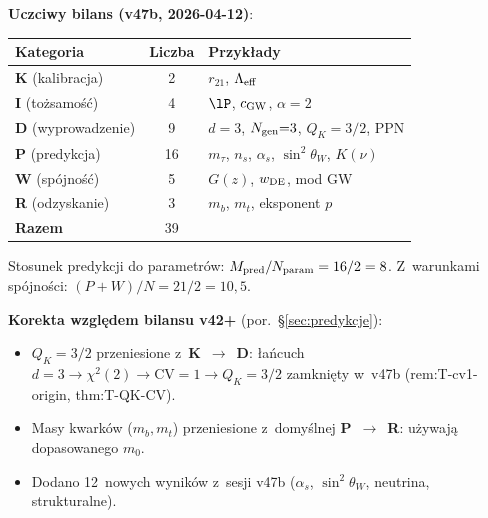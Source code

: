 \medskip\noindent
\textbf{Uczciwy bilans (v47b, 2026-04-12)}:

\begin{center}
\begin{tabular}{@{}lcl@{}}
\toprule
\textbf{Kategoria} & \textbf{Liczba} & \textbf{Przyk\l{}ady} \\
\midrule
\textbf{K} (kalibracja)        & 2  & $r_{21}$, $\Lambda_{\rm eff}$ \\
\textbf{I} (to\.zsamo\'s\'c)   & 4  & $\lP$, $c_{\rm GW}$, $\alpha{=}2$ \\
\textbf{D} (wyprowadzenie)     & 9  & $d{=}3$, $N_{\rm gen}{=}3$, $Q_K{=}3/2$, PPN \\
\textbf{P} (predykcja)         & 16 & $m_\tau$, $n_s$, $\alpha_s$, $\sin^2\theta_W$, $K(\nu)$ \\
\textbf{W} (sp\'ojno\'s\'c)   & 5  & $G(z)$, $w_{\rm DE}$, mod GW \\
\textbf{R} (odzyskanie)        & 3  & $m_b$, $m_t$, eksponent $p$ \\
\midrule
\textbf{Razem}                 & 39 & \\
\bottomrule
\end{tabular}
\end{center}

\noindent
Stosunek predykcji do parametr\'ow: $M_{\rm pred}/N_{\rm param} = 16/2 = 8$.
Z~warunkami sp\'ojno\'sci: $(P + W)/N = 21/2 = 10{,}5$.

\medskip\noindent
\textbf{Korekta wzgl\k{e}dem bilansu v42+}
(por.\ \S\ref{sec:predykcje}):
\begin{itemize}\itemsep0pt
  \item $Q_K = 3/2$ przeniesione z~\textbf{K}~$\to$~\textbf{D}:
        \l{}a\'ncuch $d{=}3 \to \chi^2(2) \to \mathrm{CV}{=}1 \to Q_K{=}3/2$
        zamkni\k{e}ty w~v47b (rem:T-cv1-origin, thm:T-QK-CV).
  \item Masy kwark\'ow ($m_b, m_t$) przeniesione z~domy\'slnej
        \textbf{P}~$\to$~\textbf{R}: u\.zywaj\k{a} dopasowanego $m_0$.
  \item Dodano 12~nowych wynik\'ow z~sesji v47b
        ($\alpha_s$, $\sin^2\theta_W$, neutrina, strukturalne).
\end{itemize}
